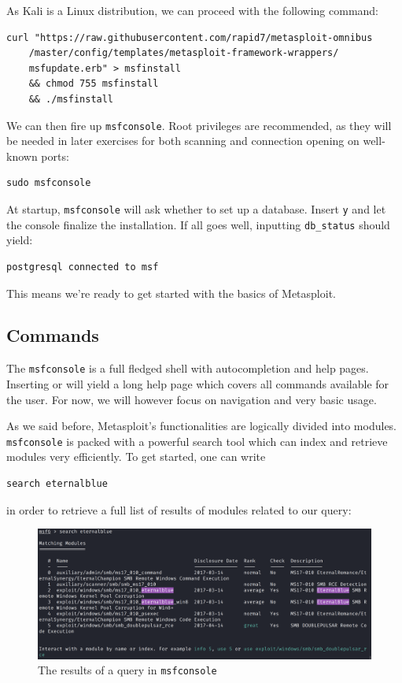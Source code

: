 As Kali is a Linux distribution, we can proceed with the following command:

\begin{lstlisting}
curl "https://raw.githubusercontent.com/rapid7/metasploit-omnibus
    /master/config/templates/metasploit-framework-wrappers/
    msfupdate.erb" > msfinstall 
    && chmod 755 msfinstall 
    && ./msfinstall
\end{lstlisting}

We can then fire up \texttt{msfconsole}. Root privileges are recommended, as they will be needed in later exercises for both scanning and connection opening on well-known ports:

\begin{lstlisting}
sudo msfconsole
\end{lstlisting}

At startup, \texttt{msfconsole} will ask whether to set up a database. Insert \texttt{y} and let the console finalize the installation. If all goes well, inputting \texttt{db\_status} should yield:

\begin{lstlisting}
postgresql connected to msf
\end{lstlisting}

This means we're ready to get started with the basics of Metasploit.

\subsection{Commands}

The \texttt{msfconsole} is a full fledged shell with autocompletion and help pages. Inserting  or  will yield a long help page which covers all commands available for the user. For now, we will however focus on navigation and very basic usage.

As we said before, Metasploit's functionalities are logically divided into modules. \texttt{msfconsole} is packed with a powerful search tool which can index and retrieve modules very efficiently. To get started, one can write

\begin{lstlisting}
search eternalblue
\end{lstlisting}

in order to retrieve a full list of results of modules related to our query:

\begin{figure}[htbp]
	\centering
	\includegraphics[width=\textwidth]{../drawable/preliminaries_screenshots/search-eternalblue.png}
    \caption{The results of a query in \texttt{msfconsole}}
    \label{fig:getting-started:query-search}
\end{figure}

